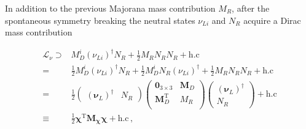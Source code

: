\begin{frame}
In addition to the previous Majorana mass contribution $M_R$, after the spontaneous symmetry breaking the neutral states $\nu_{Li}$ and $N_R$  acquire a Dirac mass contribution

\begin{align}
  \mathcal{L}_{\nu}\supset & M_D^{i} \left( \nu_{Li} \right)^{\dagger} N_R +\frac{1}{2} M_R N_R N_R +\text{h.c} \nonumber\\
  =&  \frac{1}{2}M_D^{i} \left( \nu_{Li} \right)^{\dagger} N_R
     +\frac{1}{2}M_D^{i} N_R\left( \nu_{Li} \right)^{\dagger} +\frac{1}{2} M_R N_R N_R +\text{h.c} \nonumber\\
  =&\frac{1}{2}\begin{pmatrix} \left( \boldsymbol{\nu}_{L} \right)^{\dagger}  & N_R  \end{pmatrix}
 \begin{pmatrix}
   \mathbf{0}_{3 \times 3} &            \boldsymbol{M}_D \\
   \boldsymbol{M}_D^{\operatorname{T}} & M_R \\
 \end{pmatrix}
\begin{pmatrix} \left( \boldsymbol{\nu}_{L} \right)^{\dagger}  \\
    N_R  \end{pmatrix}+\text{h.c} \nonumber\\
  \equiv&\frac{1}{2} \boldsymbol{\chi}^{\operatorname{T}} \boldsymbol{M_{\chi}} \boldsymbol{\chi}+\text{h.c}\,,
\end{align}
\end{frame}
